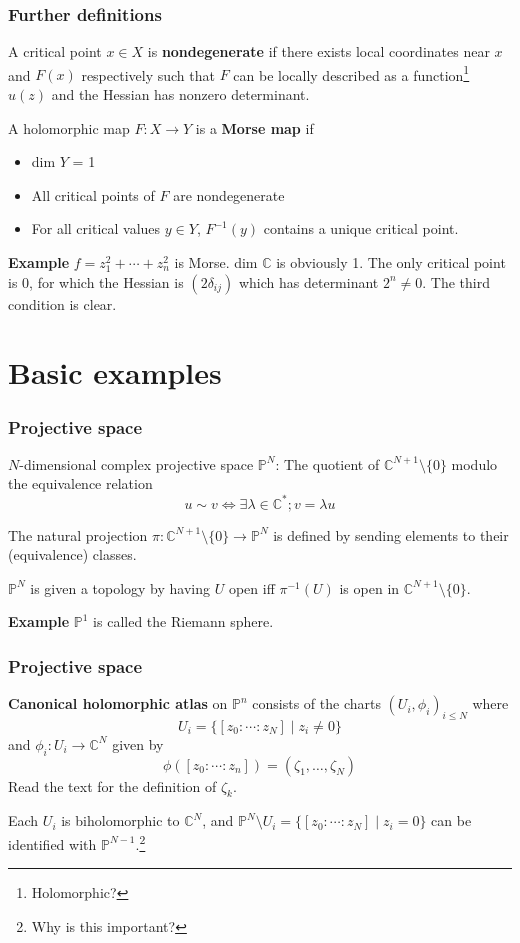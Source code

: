 \documentclass{beamer}
\begin{document}
\begin{frame}
\frametitle{Further definitions}

A critical point $x \in X$ is \textbf{nondegenerate} if there exists local coordinates near $x$ and $F(x)$ respectively such that $F$ can be locally described as a function\footnote{Holomorphic?} $u(z)$ and the Hessian has nonzero determinant.

A holomorphic map $F : X \to Y$ is a \textbf{Morse map} if \begin{itemize}
    \item dim $Y$ = 1
    \item All critical points of $F$ are nondegenerate
    \item For all critical values $y \in Y$, $F^{-1}(y)$ contains a unique critical point.
\end{itemize}

\textbf{Example} $f = z_1^2 + \cdots + z_n^2$ is Morse. dim $\mathbb{C}$ is obviously 1. The only critical point is $0$, for which the Hessian is $(2\delta_{ij})$ which has determinant $2^n \neq 0$. The third condition is clear.



\end{frame}



\section{Basic examples}

\begin{frame}
\frametitle{Projective space}

$N$-dimensional complex projective space $\mathbb{P}^N$: The quotient of $\mathbb{C}^{N+1}\setminus \{0\}$ modulo the equivalence relation \[u \sim v \Leftrightarrow \exists \lambda \in \mathbb{C}^*; v = \lambda u\]

The natural projection $\pi : \mathbb{C}^{N+1}\setminus \{0\} \to \mathbb{P}^N$ is defined by sending elements to their (equivalence) classes.

\phantom{?}

$\mathbb{P}^N$ is given a topology by having $U$ open iff $\pi^{-1}(U)$ is open in $\mathbb{C}^{N+1}\setminus \{0\}$.

\textbf{Example} $\mathbb{P}^1$ is called the Riemann sphere.
\end{frame}

\begin{frame}
\frametitle{Projective space}

\textbf{Canonical holomorphic atlas} on $\mathbb{P}^n$ consists of the charts $(U_i, \phi_i)_{i\leq N}$ where \[U_i = \{[z_0:\cdots:z_N] \mid z_i\neq 0\}\] and $\phi_i : U_i \to \mathbb{C}^N$ given by \[\phi([z_0:\cdots:z_n]) = (\zeta_1, \ldots, \zeta_N)\] Read the text for the definition of $\zeta_k$.

\phantom{?}

Each $U_i$ is biholomorphic to $\mathbb{C}^N$, and $\mathbb{P}^N\setminus U_i = \{[z_0:\cdots:z_N]\mid z_i=0\}$ can be identified with $\mathbb{P}^{N-1}$.\footnote{Why is this important?}


\end{frame}
\end{document}
